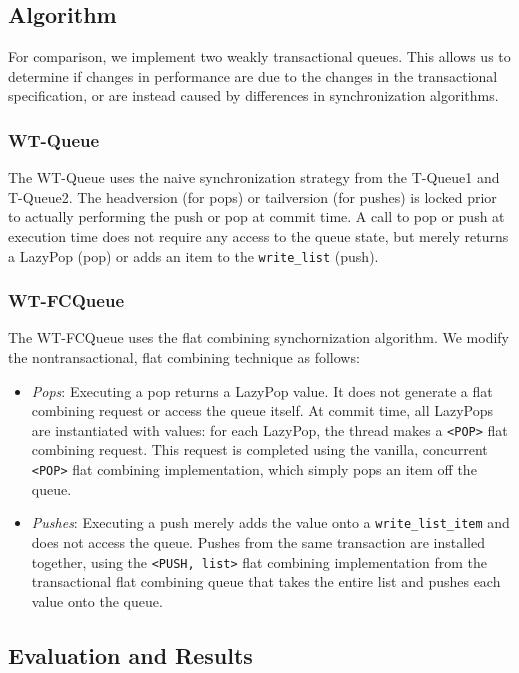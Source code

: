 \subsection{Algorithm}

For comparison, we implement two weakly transactional queues. This allows us to determine if changes in performance are due to the changes in the transactional specification, or are instead caused by differences in synchronization algorithms.

\subsubsection{WT-Queue}
The WT-Queue uses the naive synchronization strategy from the T-Queue1 and T-Queue2. The headversion (for pops) or tailversion (for pushes) is locked prior to actually performing the push or pop at commit time. A call to pop or push at execution time does not require any access to the queue state, but merely returns a LazyPop (pop) or adds an item to the \texttt{write\_list} (push).

\subsubsection{WT-FCQueue}
The WT-FCQueue uses the flat combining synchornization algorithm. We modify the nontransactional, flat combining technique as follows:
\begin{itemize}
    \item \emph{Pops}: 
    Executing a pop returns a LazyPop value. It does not generate a flat combining request or access the queue itself. At commit time, all LazyPops are instantiated with values: for each LazyPop, the thread makes a \texttt{<POP>} flat combining request. This request is completed using the vanilla, concurrent \texttt{<POP>} flat combining implementation, which simply pops an item off the queue.

    \item \emph{Pushes}: 
    Executing a push merely adds the value onto a \texttt{write\_list\_item} and does not access the queue. Pushes from the same transaction are installed together, using the \texttt{<PUSH, list>} flat combining implementation from the transactional flat combining queue that takes the entire list and pushes each value onto the queue.
\end{itemize}

\subsection{Evaluation and Results}

